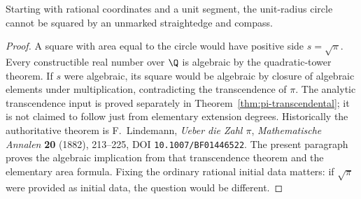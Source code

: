 \begin{theorem}
Starting with rational coordinates and a unit segment, the unit-radius circle cannot be squared by an unmarked straightedge and compass.
\end{theorem}
\begin{proof}
A square with area equal to the circle would have positive side $s=\sqrt\pi$. Every constructible real number over $\Q$ is algebraic by the quadratic-tower theorem. If $s$ were algebraic, its square would be algebraic by closure of algebraic elements under multiplication, contradicting the transcendence of $\pi$. The analytic transcendence input is proved separately in Theorem~\ref{thm:pi-transcendental}; it is not claimed to follow just from elementary extension degrees. Historically the authoritative theorem is F.~Lindemann, \emph{Ueber die Zahl $\pi$}, \emph{Mathematische Annalen} \textbf{20} (1882), 213--225, DOI \texttt{10.1007/BF01446522}. The present paragraph proves the algebraic implication from that transcendence theorem and the elementary area formula. Fixing the ordinary rational initial data matters: if $\sqrt\pi$ were provided as initial data, the question would be different.
\end{proof}


